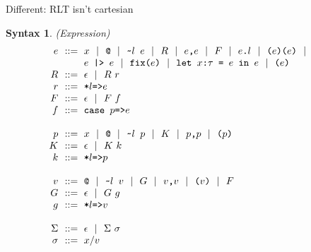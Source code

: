 \documentclass[acmsmall]{acmart}
\newtheorem{syntax}{Syntax}[section]
\begin{document}
Different: RLT isn't cartesian



\begin{syntax}(Expression)
  \[\begin{array}[t]{r@{}l}
    \nonterm{e} 
    & 
    \is 
    \begin{array}[t]{@{}l}
      \code{$x$} \sep 
      \code{@} \sep
      \code{\textasciitilde{}$l$ $e$} \sep 
      R \sep
      \code{$e$,$e$} \sep
      F \sep 
      \code{$e$.$l$} \sep
      \code{($e$)($e$)} \sep
      \\
      \code{$e$ |> $e$} \sep
      \code{fix($e$)} \sep
      \code{let $x$:$\tau$ = $e$ in $e$} \sep
      \code{($e$)}
    \end{array}
    \\
    \nonterm{R} & \is \epsilon \sep R\ r
    \\
    \nonterm{r} & \is \code{*$l$=>$e$}
    \\
    \nonterm{F} & \is \epsilon \sep F\ f
    \\
    \nonterm{f} & \is \code{case $p$=>$e$}
    \\
    \\
    \nonterm{p} & \is 
      \code{$x$} \sep
      \code{@} \sep
      \code{\textasciitilde{}$l$ $p$} \sep
      K \sep
      \code{$p$,$p$} \sep
      \code{($p$)} 
    \\
    \nonterm{K} & \is \epsilon \sep K\ k
    \\
    \nonterm{k} & \is \code{*$l$=>$p$}
    \\
    \\
    \nonterm{v} & \is 
      \code{@} \sep
      \code{\textasciitilde{}$l$ $v$} \sep
      G \sep
      \code{$v$,$v$} \sep
      \code{($v$)} \sep
      F 
    \\
    \nonterm{G} & \is \epsilon \sep G\ g
    \\
    \nonterm{g} & \is \code{*$l$=>$v$}
    \\
    \\
    \nonterm{\Sigma} & \is \epsilon \sep \Sigma\ \sigma
    \\
    \nonterm{\sigma} & \is x \slash v
  \end{array}\]
  \label{syntax:expression}
\end{syntax}
\end{document}
